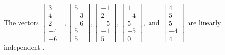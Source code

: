 \begin{exercise}
\begin{exerciseStatement}
  \end{exerciseStatement}
  \begin{exerciseAnswer}
   The vectors \(\left[\begin{array}{r}
3 \\
4 \\
2 \\
-4 \\
-6
\end{array}\right] , \left[\begin{array}{r}
5 \\
-3 \\
-6 \\
5 \\
5
\end{array}\right] , \left[\begin{array}{r}
-1 \\
2 \\
-5 \\
-1 \\
5
\end{array}\right] , \left[\begin{array}{r}
1 \\
-4 \\
5 \\
-5 \\
0
\end{array}\right] , \text{ and } \left[\begin{array}{r}
4 \\
5 \\
5 \\
-4 \\
4
\end{array}\right]\) are 
  	 linearly independent  .
  


  \end{exerciseAnswer}
\end{exercise}
